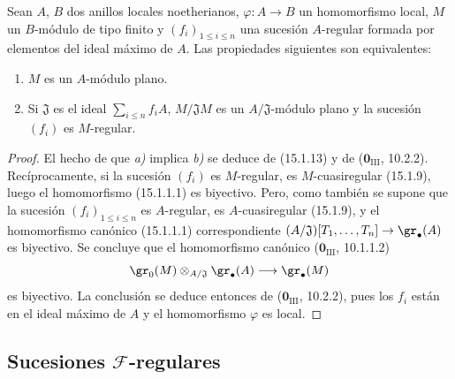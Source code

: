 \begin{proposition}[15.1.21]
\label{0.15.1.21-fr}
Sean $A$, $B$ dos anillos locales noetherianos, $\varphi:A\to B$ un
homomorfismo local, $M$ un $B$-módulo de tipo finito y
$(f_i)_{1\leq i\leq n}$ una sucesión $A$-regular formada por elementos del
ideal máximo de $A$. Las propiedades siguientes son equivalentes:
\begin{enumerate}
  \item[\textup{a)}] $M$ es un $A$-módulo plano.
  \item[\textup{b)}] Si $\mathfrak{J}$ es el ideal $\sum_{i\leq n}f_iA$,
  $M/\mathfrak{J}M$ es un $A/\mathfrak{J}$-módulo plano y la sucesión $(f_i)$
  es $M$-regular.
\end{enumerate}
\end{proposition}

\begin{proof}
El hecho de que \emph{a)} implica \emph{b)} se deduce de (15.1.13) y de
($\mathbf{0}_{\mathrm{III}}$, 10.2.2). Recíprocamente, si la sucesión $(f_i)$ es
$M$-regular, es $M$-cuasiregular (15.1.9), luego el homomorfismo
(15.1.1.1) es biyectivo. Pero, como también se supone que la sucesión
$(f_i)_{1\leq i\leq n}$ es $A$-regular, es $A$-cuasiregular (15.1.9), y el
homomorfismo canónico (15.1.1.1) correspondiente
$(A/\mathfrak{J})[T_1,\ldots,T_n]\to\gr_\bullet(A)$ es biyectivo. Se concluye
que el homomorfismo canónico ($\mathbf{0}_{\mathrm{III}}$, 10.1.1.2)
\[
  \gr_0(M)\otimes_{A/\mathfrak{J}}\gr_\bullet(A)
  \longrightarrow\gr_\bullet(M)
\]
es biyectivo. La conclusión se deduce entonces de ($\mathbf{0}_{\mathrm{III}}$,
10.2.2), pues los $f_i$ están en el ideal máximo de $A$ y el homomorfismo
$\varphi$ es local.
\end{proof}

\subsection{Sucesiones \texorpdfstring{$\mathscr{F}$}{F}-regulares}
\label{subsection:0.15.2-fr}

